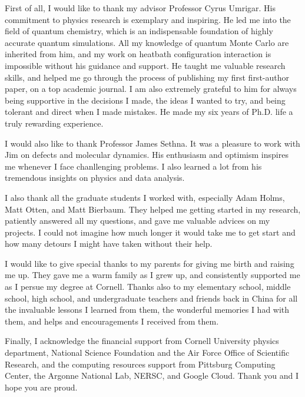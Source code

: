 \documentclass[phd,tocprelim]{cornell}
\begin{document}
\begin{acknowledgements}
First of all, I would like to thank my advisor Professor Cyrus Umrigar.
His commitment to physics research is exemplary and inspiring.
He led me into the field of quantum chemistry, which is an indispensable foundation of highly accurate quantum simulations.
All my knowledge of quantum Monte Carlo are inherited from him, and my work on heatbath configuration interaction is impossible without his guidance and support.
He taught me valuable research skills, and helped me go through the process of publishing my first first-author paper, on a top academic journal.
I am also extremely grateful to him for always being supportive in the decisions I made, the ideas I wanted to try, and being tolerant and direct when I made mistakes.
He made my six years of Ph.D. life a truly rewarding experience.

I would also like to thank Professor James Sethna.
It was a pleasure to work with Jim on defects and molecular dynamics.
His enthusiasm and optimism inspires me whenever I face chanllenging problems.
I also learned a lot from his tremendous insights on physics and data analysis.

I also thank all the graduate students I worked with, especially Adam Holms, Matt Otten, and Matt Bierbaum.
They helped me getting started in my research, patiently answered all my questions, and gave me valuable advices on my projects.
I could not imagine how much longer it would take me to get start and how many detours I might have taken without their help.

I would like to give special thanks to my parents for giving me birth and raising me up.
They gave me a warm family as I grew up, and consistently supported me as I persue my degree at Cornell.
Thanks also to my elementary school, middle school, high school, and undergraduate teachers and friends back in China for all the invaluable lessons I learned from them, the wonderful memories I had with them, and helps and encouragements I received from them.

Finally, I acknowledge the financial support from Cornell University physics department, National Science Foundation and the Air Force Office of Scientific Research, and the computing resources support from Pittsburg Computing Center, the Argonne National Lab, NERSC, and Google Cloud.
Thank you and I hope you are proud.
\end{acknowledgements}

\contentspage
\tablelistpage
\figurelistpage
\end{document}
